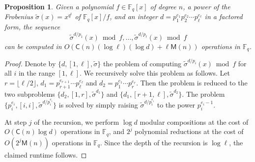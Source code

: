 \documentclass{article}
\theoremstyle{plain}
\newtheorem{proposition}[theorem]{Proposition}
\theoremstyle{definition}
\def\F{\ensuremath{\mathbb{F}}}
\def\MM{\ensuremath{\mathsf{M}}}
\def\CC{\ensuremath{\mathsf{C}}}
\begin{document}
\begin{proposition}
	\label{prop:frobs}
	Given a polynomial $f \in \F_q[x]$ of degree $n$, a power of the Frobenius $\tilde{\sigma}(x) = 
	x^{q^t}$ of $\F_q[x] / f$, and an integer $d = p_1^{e_1} p_2^{e_2} \cdots p_\ell^{e_\ell}$ in a 
	factored form, the sequence
	\begin{equation}
	\label{equ:frobs}
		\tilde{\sigma}^{d / p_1}(x) \bmod f, \dots, \tilde{\sigma}^{d / p_\ell}(x) \bmod f
	\end{equation}
	can be computed in $O(\CC(n)(\log \ell)(\log d) + \ell\MM(n))$ operations in $\F_q$.
\end{proposition}
\begin{proof}
	Denote by $\{ d, [1, \ell], \tilde{\sigma} \}$ the problem of computing $\tilde{\sigma}^{d / 
	p_i}(x) \bmod f$ for all $i$ in the range $[1, \ell]$. We recursively solve this problem as 
	follows. Let $r = \lfloor \ell / 2 \rfloor$, $d_1 = p_{r + 1}^{e_{r + 1}} \cdots 
	p_\ell^{e_\ell}$ and $d_2 = p_1^{e_1} \cdots p_r^{e_r}$. Then the problem is reduced to the 
	two subproblems $\{ d_2, [1, r], \tilde{\sigma}^{d_1} \}$ and $\{ d_1, [r + 1, \ell], 
	\tilde{\sigma}^{d_2} \}$. The problem $\{ p_i^{e_i}, [i, i], \tilde{\sigma}^{d / p_i^{e_i}} \}$ 
	is solved by simply raising $\tilde{\sigma}^{d / p_i^{e_i}}$ to the power $p_i^{e_i - 1}$.
	
	At step $j$ of the recursion, we perform $\log d$ modular compositions at the cost of $O(\CC(n) 
	\log d)$ operations in $\F_q$, and $2^j$ polynomial reductions at the cost of $O(2^j\MM(n))$ 
	operations in $\F_q$. Since the depth of the recursion is $\log \ell$, the claimed runtime 
	follows.
\end{proof}







\end{document}
